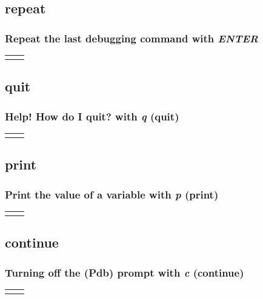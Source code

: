\subsection{repeat}
\begin{frame}
\frametitle{Repeat the last debugging command with \textit{\textbf{ENTER}}}
\begin{table}
    \begin{tabular}{p{4.7cm}p{4.7cm}}
        &
        \lstset{basicstyle=\ttfamily\tiny}
        
    \end{tabular} 
\end{table}
\end{frame}

\subsection{quit}
\begin{frame}
\frametitle{Help! How do I quit? with \textit{\textbf{q}} (quit)}
\begin{table}
    \begin{tabular}{p{4.7cm}p{4.7cm}}
        &
        \lstset{basicstyle=\ttfamily\tiny}
        
    \end{tabular} 
\end{table}
\end{frame}

\subsection{print}
\begin{frame}
\frametitle{Print the value of a variable with \textit{\textbf{p}} (print)}
\begin{table}
    \begin{tabular}{p{4.7cm}p{4.7cm}}
        &
        \lstset{basicstyle=\ttfamily\tiny}
        
    \end{tabular} 
\end{table}
\end{frame}

\subsection{continue}
\begin{frame}
\frametitle{Turning off the (Pdb) prompt with \textit{\textbf{c}} (continue)}
\begin{table}
    \begin{tabular}{p{4.7cm}p{4.7cm}}
        &
        \lstset{basicstyle=\ttfamily\tiny}
        
    \end{tabular} 
\end{table}
\end{frame}

